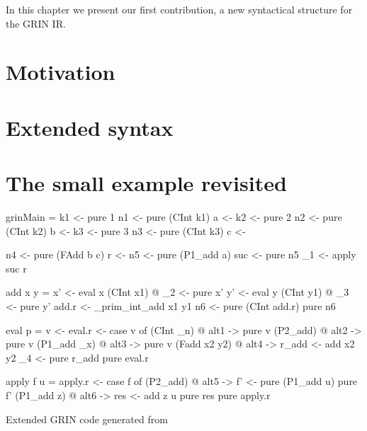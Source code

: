 \documentclass[main.tex]{subfiles}
\begin{document}
  In this chapter we present our first contribution, a new syntactical structure for the GRIN IR.

  \section{Motivation}

  \section{Extended syntax}
  
	

  \section{The small example revisited}

  \hspace{-0.5cm}
  \begin{codeFloat}
    \begin{minipage}{0.48\textwidth}
      \begin{haskell}
        grinMain =
          k1 <- pure 1
          n1 <- pure (CInt k1)
          a  <- %
          k2 <- pure 2
          n2 <- pure (CInt k2)
          b  <- %
          k3 <- pure 3
          n3 <- pure (CInt k3)
          c  <- %

          n4  <- pure (FAdd b c)
          r   <- %
          n5  <- pure (P1_add a)
          suc <- pure n5
          _1  <- apply suc r

        add x y =
          x' <- eval x
          (CInt x1) @ _2 <- pure x'
          y' <- eval y
          (CInt y1) @ _3 <- pure y'
          add.r <- _prim_int_add x1 y1
          n6 <- pure (CInt add.r)
          pure n6
      \end{haskell}
    \end{minipage}
    \hfill
    \begin{minipage}{0.50\textwidth}
      \begin{haskellNum}{12}
       eval p =
         v <- %
         eval.r <- case v of
           (CInt _n) @ alt1 ->
              pure v
           (P2_add) @ alt2 ->
              pure v
           (P1_add _x) @ alt3 ->
              pure v
           (Fadd x2 y2) @ alt4 ->
             r_add <- add x2 y2
             _4 <- %
             pure r_add
         pure eval.r


       apply f u =
         apply.r <- case f of
           (P2_add) @ alt5 ->
             f' <- pure (P1_add u)
             pure f'
           (P1_add z) @ alt6 ->
             res <- add z u
             pure res
         pure apply.r
      \end{haskellNum}
    \end{minipage}
    \caption{Extended GRIN code generated from }
    \label{code:grin-add-es}

  \end{codeFloat}
\end{document}
